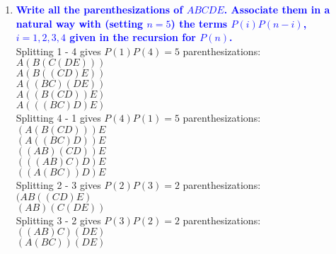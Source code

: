 \documentclass[11pt]{article}
\begin{document}
\begin{enumerate}
    
\item \textbf{\textcolor{blue}{Write all the parenthesizations of $ABCDE$.
Associate them in a natural way with (setting $n=5$) the
terms $P(i)P(n-i)$, $i=1,2,3,4$ given in the recursion for $P(n)$.}}
    \\ Splitting 1 - 4 gives $P(1)P(4) = 5$ parenthesizations:
    \\ $A(B(C(DE)))$
    \\ $A(B((CD)E))$
    \\ $A((BC)(DE))$
    \\ $A((B(CD))E)$
    \\ $A(((BC)D)E)$
    \\ Splitting 4 - 1 gives $P(4)P(1) = 5$ parenthesizations:
    \\ $(A(B(CD)))E$
    \\ $(A((BC)D))E$
    \\ $((AB)(CD))E$
    \\ $(((AB)C)D)E$
    \\ $((A(BC))D)E$
    \\ Splitting 2 - 3 gives $P(2)P(3) = 2$ parenthesizations:
    \\ $(AB((CD)E)$
    \\ $(AB)(C(DE))$
    \\ Splitting 3 - 2 gives $P(3)P(2) = 2$ parenthesizations:
    \\ $((AB)C)(DE)$
    \\ $(A(BC))(DE)$


\end{enumerate}
\end{document}

